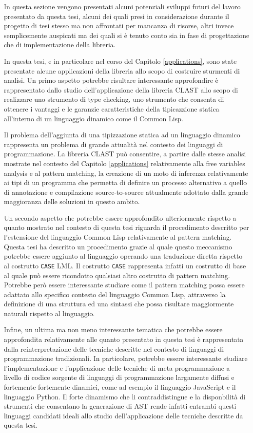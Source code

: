 \documentclass{book}
\begin{document}
In questa sezione vengono presentati alcuni potenziali sviluppi futuri del
lavoro presentato da questa tesi, alcuni dei quali presi in considerazione
durante il progetto di tesi stesso ma non affrontati per mancanza di risorse,
altri invece semplicemente auspicati ma dei quali si è tenuto conto sia in fase
di progettazione che di implementazione della libreria.

In questa tesi, e in particolare nel corso del Capitolo \ref{applications}, sono
state presentate alcune applicazioni della libreria allo scopo di costruire
sturmenti di analisi. Un primo aspetto potrebbe risultare interessante
approfondire è rappresentato dallo studio dell'applicazione della libreria CLAST
allo scopo di realizzare uno strumento di type checking, uno strumento che
consenta di ottenere i vantaggi e le garanzie caratteristiche della tipicazzione
statica all'interno di un linguaggio dinamico come il Common Lisp.

Il problema dell'aggiunta di una tipizzazione statica ad un linguaggio dinamico
rappresenta un problema di grande attualità nel contesto dei linguaggi di
programmazione. La libreria CLAST può consentire, a partire dalle stesse analisi
mostrate nel contesto del Capitolo \ref{applications} relativamente alla free
variables analysis e al pattern matching, la creazione di un moto di inferenza
relativamente ai tipi di un programma che permetta di definire un processo
alternativo a quello di annotazione e compilazione source-to-source attualmente
adottato dalla grande maggioranza delle soluzioni in questo ambito.

Un secondo aspetto che potrebbe essere approfondito ulteriormente rispetto a
quanto mostrato nel contesto di questa tesi riguarda il procedimento descritto
per l'estensione del linguaggio Common Lisp relativamente al pattern matching.
Questa tesi ha descritto un procedimento grazie al quale questo meccanismo
potrebbe essere aggiunto al linguaggio operando una traduzione diretta rispetto
al costrutto \texttt{CASE} LML. Il costrutto \texttt{CASE} rappresenta infatti
un costrutto di base al quale può essere ricondotto qualsiasi altro costrutto di
pattern matching. Potrebbe però essere interessante studiare come il pattern
matching possa essere adattato allo specifico contesto del linguaggio Common
Lisp, attraverso la definizione di una struttura ed una sintassi che possa
risultare maggiormente naturali rispetto al linguaggio.

Infine, un ultima ma non meno interessante tematica che potrebbe essere
approfondita relativamente alle quanto presentato in questa tesi è rappresentata
dalla reinterpretazione delle tecniche descritte nel contesto di linguaggi di
programmazione tradizionali. In particolare, potrebbe essere interessante
studiare l'implementazione e l'applicazione delle tecniche di meta
programmazione a livello di codice sorgente di linguaggi di programmazione
largamente diffusi e fortemente fortemente dinamici, come ad esempio il
linguaggio JavaScript e il linguaggio Python. Il forte dinamismo che li
contraddistingue e la disponbilità di strumenti che consentano la generazione di
AST rende infatti entrambi questi linguaggi candidati ideali allo studio
dell'applicazione delle tecniche descritte da questa tesi.

\printbibliography[filter=papers,title={Articoli Citati}]
\printbibliography[type=book,title={Bibliografia}]
\printbibliography[type=misc,title={Sitografia}]
\end{document}
